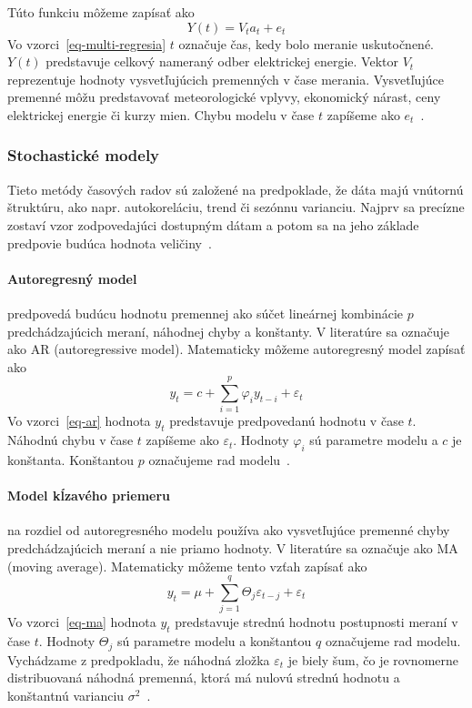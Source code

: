 \documentclass[a4paper,slovak,12pt,appendix]{article}
\begin{document}
Túto funkciu môžeme zapísať ako
\begin{equation}
  Y(t) = V_t a_t + e_t
  \label{eq-multi-regresia}
\end{equation}
Vo vzorci~\ref{eq-multi-regresia} $t$ označuje čas, kedy bolo meranie
uskutočnené. $Y(t)$ predstavuje celkový nameraný odber elektrickej energie.
Vektor $V_t$ reprezentuje hodnoty vysvetľujúcich premenných v čase merania.
Vysvetľujúce premenné môžu predstavovať meteorologické vplyvy, ekonomický
nárast, ceny elektrickej energie či kurzy mien. Chybu modelu v čase $t$
zapíšeme ako $e_t$~\cite{KumarSingh2013, Mahalakshmi2016}.


\subsubsection{Stochastické modely}
Tieto metódy časových radov sú založené na predpoklade, že dáta majú vnútornú
štruktúru, ako napr. autokoreláciu, trend či sezónnu varianciu. Najprv sa
precízne zostaví vzor zodpovedajúci dostupným dátam a potom sa na jeho základe
predpovie budúca hodnota veličiny~\cite{KumarSingh2013}.

\paragraph{Autoregresný model} predpovedá budúcu hodnotu premennej ako súčet
lineárnej kombinácie $p$ predchádzajúcich meraní, náhodnej chyby a konštanty.
V literatúre sa označuje ako AR (autoregressive model). Matematicky môžeme
autoregresný model zapísať ako
\begin{equation}
  y_t = c + \sum_{i=1}^{p} \varphi_i y_{t-i} + \varepsilon_t
  \label{eq-ar}
\end{equation}
Vo vzorci~\ref{eq-ar} hodnota $y_t$ predstavuje predpovedanú hodnotu
v čase $t$. Náhodnú chybu v čase $t$ zapíšeme ako $\varepsilon_t$. Hodnoty
$\varphi_i$ sú parametre modelu a $c$ je konštanta. Konštantou $p$ označujeme
rad modelu~\cite{Agrawal2013}.

\paragraph{Model kĺzavého priemeru} na rozdiel od autoregresného modelu používa
ako vysvetľujúce premenné chyby predchádzajúcich meraní a nie priamo hodnoty.
V literatúre sa označuje ako MA (moving average). Matematicky môžeme tento
vzťah zapísať ako
\begin{equation}
  y_t = \mu + \sum_{j=1}^{q} \Theta_j \varepsilon_{t-j} + \varepsilon_t
  \label{eq-ma}
\end{equation}
Vo vzorci~\ref{eq-ma} hodnota $y_t$ predstavuje strednú hodnotu
postupnosti meraní v čase $t$. Hodnoty $\Theta_j$ sú parametre modelu
a konštantou $q$ označujeme rad modelu. Vychádzame z predpokladu, že náhodná
zložka $\varepsilon_t$ je biely šum, čo je rovnomerne distribuovaná náhodná
premenná, ktorá má nulovú strednú hodnotu a konštantnú varianciu
$\sigma^2$~\cite{Agrawal2013}.
\end{document}
